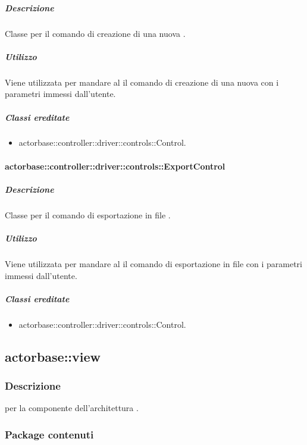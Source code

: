 \documentclass{scalatekids-article}
\begin{document}
\subparagraph{Descrizione}

Classe per il comando di creazione di una nuova .

\subparagraph{Utilizzo}

Viene utilizzata per mandare al  il comando di creazione di una nuova  con i parametri immessi dall'utente.

\subparagraph{Classi ereditate}

\begin{itemize}
\item actorbase::controller::driver::controls::Control.
\end{itemize}

\paragraph{actorbase::controller::driver::controls::ExportControl}

\subparagraph{Descrizione}

Classe per il comando di esportazione in file .

\subparagraph{Utilizzo}

Viene utilizzata per mandare al  il comando di esportazione in file  con i parametri immessi dall'utente.

\subparagraph{Classi ereditate}

\begin{itemize}
\item actorbase::controller::driver::controls::Control.
\end{itemize}


\subsection{actorbase::view}

\subsubsection{Descrizione}

 per la componente  dell'architettura .

\subsubsection{Package contenuti}
\end{document}
